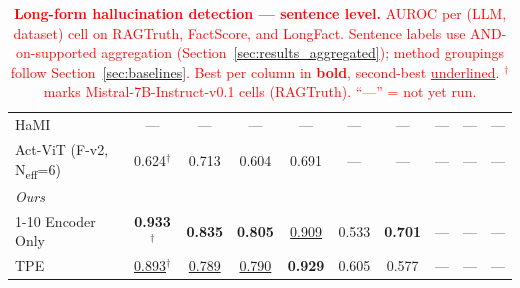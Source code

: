 \begin{table}[!b]
{\begin{tabular}{l ccc ccc ccc}
HaMI                             & --- & --- & --- & --- & --- & --- & --- & --- & --- \\
Act-ViT (F-v2, N\textsubscript{eff}=6)
                                 & 0.624$^{\dagger}$ & 0.713 & 0.604 & 0.691 & --- & --- & --- & --- & --- \\
\midrule
\multicolumn{10}{l}{\textit{Ours}} \\
\cmidrule(l){1-10}
Encoder Only               & \textbf{0.933}$^{\dagger}$ & \textbf{0.835} & \textbf{0.805} & \underline{0.909} & 0.533 & \textbf{0.701} & --- & --- & --- \\
TPE                   & \underline{0.893}$^{\dagger}$ & \underline{0.789} & \underline{0.790} & \textbf{0.929} & 0.605 & 0.577 & --- & --- & --- \\
\bottomrule
\end{tabular}%
}
\caption{\textcolor{red}{\textbf{Long-form hallucination detection --- sentence
level.} AUROC per (LLM, dataset) cell on RAGTruth, FactScore, and LongFact.
Sentence labels use AND-on-supported aggregation
(Section~\ref{sec:results_aggregated}); method groupings follow
Section~\ref{sec:baselines}. Best per column in \textbf{bold},
second-best \underline{underlined}. $^\dagger$ marks
Mistral-7B-Instruct-v0.1 cells (RAGTruth). ``---'' = not yet run.}}
\label{tab:main}
\end{table}
